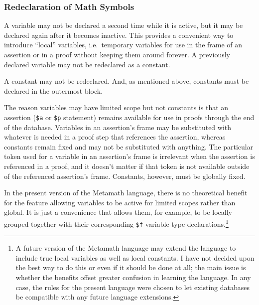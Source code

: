 \subsubsection{Redeclaration of Math Symbols}
\label{redeclaration}


A variable may not be declared a second time while it is active, but it may be
declared again after it becomes inactive.  This provides a convenient way to
introduce ``local'' variables, i.e.\ temporary variables
for use in the frame of an assertion or in a proof without keeping them around
forever.  A previously declared variable may not be redeclared as a constant.

A constant may not be redeclared.  And, as mentioned above, constants must be
declared in the outermost block.

The reason variables may have limited scope but not constants is that an
assertion (\texttt{\$a} or \texttt{\$p} statement) remains available for use in
proofs through the end of the database.  Variables in an assertion's frame may
be substituted with whatever is needed in a proof step that references the
assertion, whereas constants remain fixed and may not be substituted with
anything.  The particular token used for a variable in an assertion's frame is
irrelevant when the assertion is referenced in a proof, and it doesn't matter
if that token is not available outside of the referenced assertion's frame.
Constants, however, must be globally fixed.

In the present version of the Metamath language, there is no theoretical
benefit for the feature allowing variables to be active for limited scopes
rather than global. It is just a convenience that allows them, for example, to
be locally grouped together with their corresponding \texttt{\$f} variable-type
declarations.\footnote{A future version\label{redeclarationf} of the Metamath
language may extend the language to include true local variables as well as
local constants.  I have not decided upon the best way to do this or even if
it should be done at all; the main issue is whether the benefits offset
greater confusion in learning the language.  In any case, the rules for
the present language were chosen to let existing databases be compatible with
any future language extensions.}

